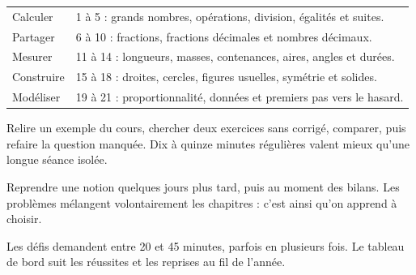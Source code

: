 \clearpage\thispagestyle{otFront}\label{parcours}\fontsize{11}{15}\selectfont

\begin{tabularx}{\linewidth}{@{}lY@{}}\toprule
Calculer & 1 à 5 : grands nombres, opérations, division, égalités et suites.\\[3mm]
Partager & 6 à 10 : fractions, fractions décimales et nombres décimaux.\\[3mm]
Mesurer & 11 à 14 : longueurs, masses, contenances, aires, angles et durées.\\[3mm]
Construire & 15 à 18 : droites, cercles, figures usuelles, symétrie et solides.\\[3mm]
Modéliser & 19 à 21 : proportionnalité, données et premiers pas vers le hasard.\\\bottomrule
\end{tabularx}
\begin{savoirfaire}Relire un exemple du cours,
chercher deux exercices sans corrigé, comparer, puis refaire la question
manquée. Dix à quinze minutes régulières valent mieux qu’une longue
séance isolée.\end{savoirfaire}
\begin{savoirfaire}Reprendre une notion quelques jours
plus tard, puis au moment des bilans. Les problèmes mélangent
volontairement les chapitres : c’est ainsi qu’on apprend à choisir.\end{savoirfaire}
Les défis demandent entre 20 et 45 minutes, parfois en plusieurs fois.
Le tableau de bord suit les réussites et les reprises au fil de l’année.

\clearpage
